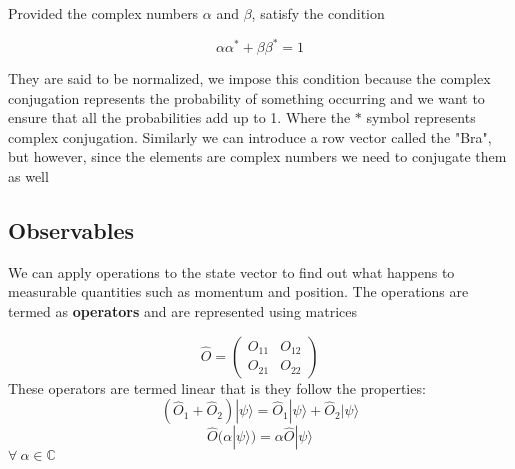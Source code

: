\documentclass[]{article}
\begin{document}

Provided the complex numbers $\alpha$ and $\beta$, satisfy the condition

$$\alpha \alpha^{*} + \beta \beta^{*} = 1 $$

They are said to be normalized, we impose this condition because the complex conjugation represents the probability of something occurring and we want to ensure that all the probabilities add up to 1. Where the $*$ symbol represents complex conjugation. Similarly we can introduce a row vector called the "Bra", but however, since the elements are complex numbers we need to conjugate them as well



%





\subsection{Observables}

We can apply operations to the state vector to find out what happens to measurable quantities such as momentum and position. The operations are termed as \textbf{operators} and are represented using matrices

$$\hat{O} = \begin{pmatrix}
O_{11} & O_{12}\\
O_{21} & O_{22}
\end{pmatrix}$$
These operators are termed linear that is they follow the properties:
$$(\hat{O}_1 + \hat{O}_2)|\psi\rangle = \hat{O}_1|\psi\rangle+ \hat{O}_2 |\psi\rangle$$
$$\hat{O} (\alpha |\psi\rangle) = \alpha \hat{O} |\psi\rangle$$
$\forall \ \alpha \in \mathbb{C}$
\end{document}
